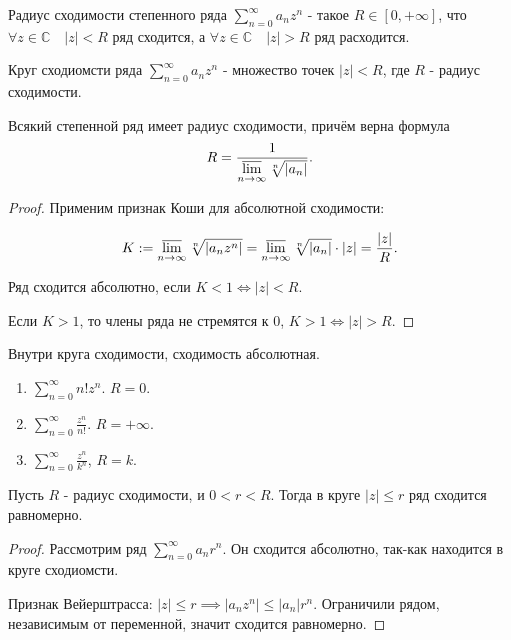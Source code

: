 \begin{definition} \thmslashn 

    Радиус сходимости степенного ряда $\sum\limits_{n=0}^{\infty} a_{n}z^{n}$ - такое $R\in [0, +\infty]$, что $\forall{z\in \mathbb{C}}\quad |z| < R$ ряд сходится, а $\forall{z\in \mathbb{C}}\quad |z| > R$ ряд расходится.
\end{definition}
\begin{definition} \thmslashn 

    Круг сходиомсти ряда $\sum\limits_{n=0}^{\infty} a_{n}z^{n}$ - множество точек $|z| < R$, где $R$ - радиус сходимости.
\end{definition}
\begin{theorem} \thmslashn

   Всякий степенной ряд имеет радиус сходимости, причём верна формула
   \[ R = \frac{1}{\varlimsup\limits_{n \to \infty} \sqrt[n]{ |a_{n}| } } .\]
   \begin{proof} \thmslashn
   
       Применим признак Коши для абсолютной сходимости:

       \[ K := \varlimsup\limits_{n\to \infty} \sqrt[n]{ |a_{n}z^{n}| } = \varlimsup\limits_{n \to \infty} \sqrt[n]{ |a_{n}| } \cdot |z| = \frac{ |z| }{R}  .\]

       Ряд сходится абсолютно, если $K < 1 \iff |z| < R$.

       Если $K > 1$, то члены ряда не стремятся к $0$, $K > 1 \iff |z| > R$.
   \end{proof}
\end{theorem}
\begin{consequence} \thmslashn

    Внутри круга сходимости, сходимость абсолютная.
\end{consequence}
\begin{example} \thmslashn

    \begin{enumerate}
        \item $\sum\limits_{n=0}^{\infty} n! z^{n}$. $R = 0$.
        \item $\sum\limits_{n=0}^{\infty} \frac{z^{n}}{n!}$. $R = +\infty$.
        \item $\sum\limits_{n=0}^{\infty} \frac{z^{n}}{k^{n}}$, $R = k$.
    \end{enumerate}
\end{example}
\begin{theorem} \thmslashn

    Пусть $R$ - радиус сходимости, и $0 < r < R$. Тогда в круге $|z| \le r$ ряд сходится равномерно.
    \begin{proof} \thmslashn
    
        Рассмотрим ряд $\sum\limits_{n=0}^{\infty} a_{n}r^{n}$. Он сходится абсолютно, так-как находится в круге сходиомсти.

        Признак Вейерштрасса: $|z| \le r \implies |a_{n}z^{n}| \le |a_{n}|r^{n}$. Ограничили рядом, независимым от переменной, значит сходится равномерно.
    \end{proof}
\end{theorem}
